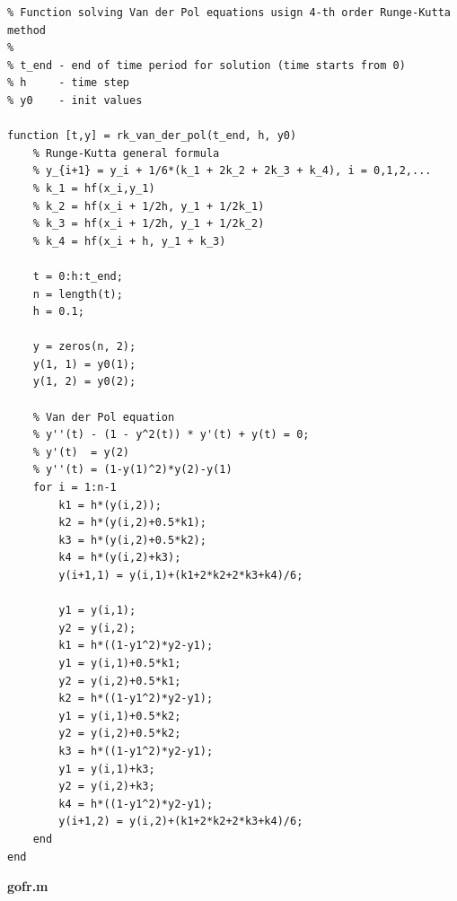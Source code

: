 \begin{lstlisting}
% Function solving Van der Pol equations usign 4-th order Runge-Kutta method
%
% t_end - end of time period for solution (time starts from 0)
% h     - time step
% y0    - init values

function [t,y] = rk_van_der_pol(t_end, h, y0)
    % Runge-Kutta general formula
    % y_{i+1} = y_i + 1/6*(k_1 + 2k_2 + 2k_3 + k_4), i = 0,1,2,...
    % k_1 = hf(x_i,y_1)
    % k_2 = hf(x_i + 1/2h, y_1 + 1/2k_1)
    % k_3 = hf(x_i + 1/2h, y_1 + 1/2k_2)    
    % k_4 = hf(x_i + h, y_1 + k_3)
    
    t = 0:h:t_end;
    n = length(t);
    h = 0.1;

    y = zeros(n, 2);
    y(1, 1) = y0(1);
    y(1, 2) = y0(2);
    
    % Van der Pol equation 
    % y''(t) - (1 - y^2(t)) * y'(t) + y(t) = 0;
    % y'(t)  = y(2)
    % y''(t) = (1-y(1)^2)*y(2)-y(1)
    for i = 1:n-1
        k1 = h*(y(i,2));
        k2 = h*(y(i,2)+0.5*k1);
        k3 = h*(y(i,2)+0.5*k2);
        k4 = h*(y(i,2)+k3);
        y(i+1,1) = y(i,1)+(k1+2*k2+2*k3+k4)/6;
        
        y1 = y(i,1);
        y2 = y(i,2);
        k1 = h*((1-y1^2)*y2-y1);
        y1 = y(i,1)+0.5*k1;
        y2 = y(i,2)+0.5*k1;
        k2 = h*((1-y1^2)*y2-y1);
        y1 = y(i,1)+0.5*k2;
        y2 = y(i,2)+0.5*k2;
        k3 = h*((1-y1^2)*y2-y1);
        y1 = y(i,1)+k3;
        y2 = y(i,2)+k3;
        k4 = h*((1-y1^2)*y2-y1);
        y(i+1,2) = y(i,2)+(k1+2*k2+2*k3+k4)/6;
    end
end

\end{lstlisting}

\textbf{gofr.m}

